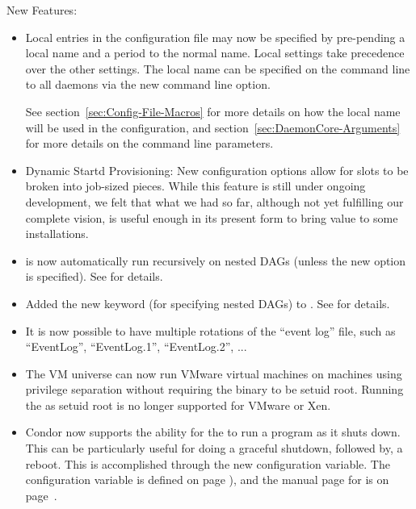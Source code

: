 \noindent New Features:

\begin{itemize}

\item Local entries in the configuration file may now be specified
by pre-pending a local name and a period to the normal name.
Local settings take precedence over the other settings.
The local name can be specified on the command line to all daemons via
the new  command line option. 

See section~\ref{sec:Config-File-Macros} 
for more details on how the local name will be used in the configuration,
and section~\ref{sec:DaemonCore-Arguments} 
for more details on the command line parameters.

\item Dynamic Startd Provisioning: New configuration options allow for slots
	to be broken into job-sized pieces. While this feature is still under
	ongoing development, we felt that what we had so far, although not yet
	fulfilling our complete vision, is useful enough in its present form to
	bring value to some installations.

\item {} is now automatically run recursively on
nested DAGs (unless the new  option is specified).
See \pageref{sec:DAGsinDAGs} for details.

\item Added the new  keyword (for specifying nested
DAGs) to .  See \pageref{sec:DAGsinDAGs} for details.

\item It is now possible to have multiple rotations of the ``event
  log'' file, such as ``EventLog'', ``EventLog.1'', ``EventLog.2'', ...

\item The VM universe can now run VMware virtual machines on machines using
privilege separation without requiring the  binary to be
setuid root. Running the  as setuid root is no longer
supported for VMware or Xen.

\item Condor now supports the ability for the  to run a
  program as it shuts down.  This can be particularly useful for doing
  a graceful shutdown, followed by, a reboot.  This is
  accomplished through the new 
   configuration variable.
  The configuration variable 
  is defined on page \pageref{param:MasterShutdownProgram}),
  and the manual page for 
  is on page~\pageref{man-condor-set-shutdown}.


\end{itemize}
